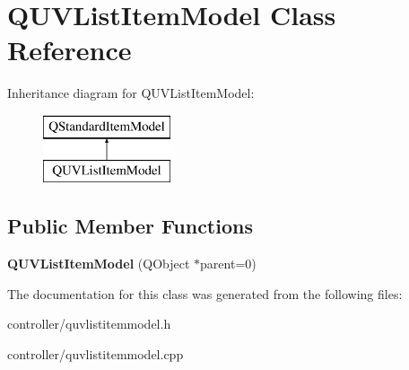 \hypertarget{classQUVListItemModel}{\section{Q\+U\+V\+List\+Item\+Model Class Reference}
\label{classQUVListItemModel}
}
Inheritance diagram for Q\+U\+V\+List\+Item\+Model\+:\begin{figure}[H]
\begin{center}
\leavevmode
\includegraphics[height=2.000000cm]{classQUVListItemModel}
\end{center}
\end{figure}
\subsection*{Public Member Functions}
\begin{DoxyCompactItemize}
\item 
\hypertarget{classQUVListItemModel_af5d794524ca6e123a8173d988f89e3f8}{{\bfseries Q\+U\+V\+List\+Item\+Model} (Q\+Object $\ast$parent=0)}\label{classQUVListItemModel_af5d794524ca6e123a8173d988f89e3f8}

\end{DoxyCompactItemize}


The documentation for this class was generated from the following files\+:\begin{DoxyCompactItemize}
\item 
controller/quvlistitemmodel.\+h\item 
controller/quvlistitemmodel.\+cpp\end{DoxyCompactItemize}
